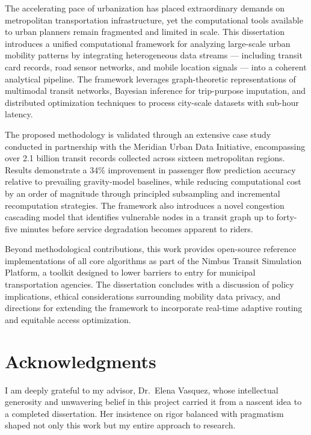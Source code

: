 \documentclass[12pt,letterpaper,twoside]{report}
\begin{document}
\begin{abstractbox}
\singlespacing
The accelerating pace of urbanization has placed extraordinary demands on metropolitan transportation infrastructure, yet the computational tools available to urban planners remain fragmented and limited in scale. This dissertation introduces a unified computational framework for analyzing large-scale urban mobility patterns by integrating heterogeneous data streams --- including transit card records, road sensor networks, and mobile location signals --- into a coherent analytical pipeline. The framework leverages graph-theoretic representations of multimodal transit networks, Bayesian inference for trip-purpose imputation, and distributed optimization techniques to process city-scale datasets with sub-hour latency.

The proposed methodology is validated through an extensive case study conducted in partnership with the Meridian Urban Data Initiative, encompassing over 2.1 billion transit records collected across sixteen metropolitan regions. Results demonstrate a 34\% improvement in passenger flow prediction accuracy relative to prevailing gravity-model baselines, while reducing computational cost by an order of magnitude through principled subsampling and incremental recomputation strategies. The framework also introduces a novel congestion cascading model that identifies vulnerable nodes in a transit graph up to forty-five minutes before service degradation becomes apparent to riders.

Beyond methodological contributions, this work provides open-source reference implementations of all core algorithms as part of the Nimbus Transit Simulation Platform, a toolkit designed to lower barriers to entry for municipal transportation agencies. The dissertation concludes with a discussion of policy implications, ethical considerations surrounding mobility data privacy, and directions for extending the framework to incorporate real-time adaptive routing and equitable access optimization.
\end{abstractbox}

\chapter*{Acknowledgments}
\thispagestyle{plain}

\singlespacing
I am deeply grateful to my advisor, Dr.\ Elena Vasquez, whose intellectual generosity and unwavering belief in this project carried it from a nascent idea to a completed dissertation. Her insistence on rigor balanced with pragmatism shaped not only this work but my entire approach to research.
\end{document}
